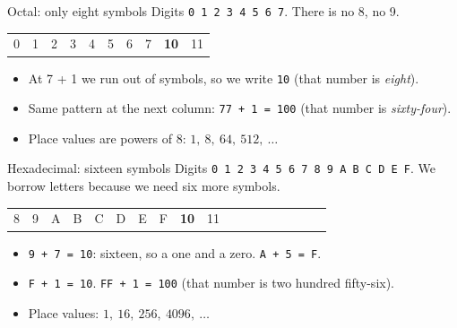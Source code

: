 \documentclass[aspectratio=169,10pt]{beamer}
\begin{document}
\begin{frame}{Octal: only eight symbols}
Digits \texttt{0 1 2 3 4 5 6 7}. There is no 8, no 9.
\begin{center}
\begin{tabular}{cccccccccc}
0&1&2&3&4&5&6&7&\textbf{10}&11
\end{tabular}
\end{center}
\begin{itemize}
\item At 7 + 1 we run out of symbols, so we write \texttt{10} (that number is \emph{eight}).
\item Same pattern at the next column: \texttt{77 + 1 = 100} (that number is \emph{sixty-four}).
\item Place values are powers of 8: $1,\ 8,\ 64,\ 512,\ \dots$
\end{itemize}
\end{frame}

\begin{frame}{Hexadecimal: sixteen symbols}
Digits \texttt{0 1 2 3 4 5 6 7 8 9 A B C D E F}. We borrow letters because we need six more symbols.
\begin{center}
\begin{tabular}{cccccccccccccccccc}
8&9&A&B&C&D&E&F&\textbf{10}&11
\end{tabular}
\end{center}
\begin{itemize}
\item \texttt{9 + 7 = 10}: sixteen, so a one and a zero. \texttt{A + 5 = F}.
\item \texttt{F + 1 = 10}. \texttt{FF + 1 = 100} (that number is two hundred fifty-six).
\item Place values: $1,\ 16,\ 256,\ 4096,\ \dots$
\end{itemize}
\end{frame}
\end{document}
